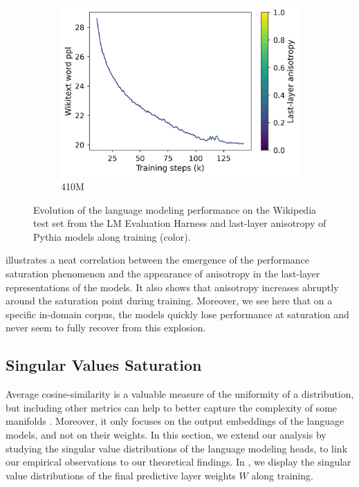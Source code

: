 \begin{figure}[h]
\begin{subfigure}{0.33\columnwidth}
         \includegraphics[width=\linewidth]{sources/part_1/softmax_bottleneck/imgs/anisotropy_explosion_410m.png}
         \caption{410M}
         \label{fig:410M}
    \end{subfigure}
    \caption{Evolution of the language modeling performance on the Wikipedia test set from the LM Evaluation Harness \citep{eval-harness} and last-layer anisotropy of Pythia models along training (color).}
    \label{fig:aniso_v_saturation}
\end{figure}

 illustrates a neat correlation between the emergence of the performance saturation phenomenon and the appearance of anisotropy in the last-layer representations of the models. It also shows that anisotropy increases abruptly around the saturation point during training. Moreover, we see here that on a specific in-domain corpus, the models quickly lose performance at saturation and never seem to fully recover from this explosion.

\subsection{Singular Values Saturation}
\label{sub:saturation}

Average cosine-similarity is a valuable measure of the uniformity of a distribution, but including other metrics can help to better capture the complexity of some manifolds \citep{rudman-etal-2022-isoscore}. Moreover, it only focuses on the output embeddings of the language models, and not on their weights. In this section, we extend our analysis by studying the singular value distributions of the language modeling heads, to link our empirical observations to our theoretical findings. In , we display the singular value distributions of the final predictive layer weights $W$ along training.

